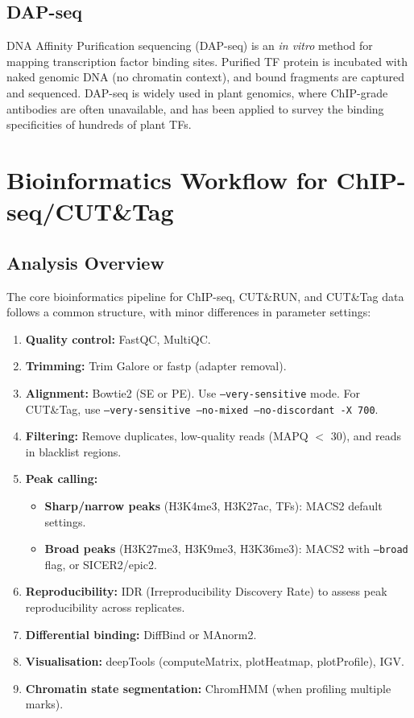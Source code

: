 \subsection{DAP-seq}
\label{subsec:histones:dap}

DNA Affinity Purification sequencing (DAP-seq) is an \textit{in vitro} method for mapping transcription factor binding sites. Purified TF protein is incubated with naked genomic DNA (no chromatin context), and bound fragments are captured and sequenced. DAP-seq is widely used in plant genomics, where ChIP-grade antibodies are often unavailable, and has been applied to survey the binding specificities of hundreds of plant TFs.

\section{Bioinformatics Workflow for ChIP-seq/CUT\&Tag}
\label{sec:histones:bioinformatics}

\subsection{Analysis Overview}
\label{subsec:histones:analysis-overview}

The core bioinformatics pipeline for ChIP-seq, CUT\&RUN, and CUT\&Tag data follows a common structure, with minor differences in parameter settings:

\begin{enumerate}[itemsep=2pt]
  \item \textbf{Quality control:} FastQC, MultiQC.
  \item \textbf{Trimming:} Trim Galore or fastp (adapter removal).
  \item \textbf{Alignment:} Bowtie2 (SE or PE). Use \texttt{--very-sensitive} mode. For CUT\&Tag, use \texttt{--very-sensitive --no-mixed --no-discordant -X 700}.
  \item \textbf{Filtering:} Remove duplicates, low-quality reads (MAPQ $<$ 30), and reads in blacklist regions.
  \item \textbf{Peak calling:}
    \begin{itemize}[itemsep=1pt]
      \item \textbf{Sharp/narrow peaks} (H3K4me3, H3K27ac, TFs): MACS2 default settings.
      \item \textbf{Broad peaks} (H3K27me3, H3K9me3, H3K36me3): MACS2 with \texttt{--broad} flag, or SICER2/epic2.
    \end{itemize}
  \item \textbf{Reproducibility:} IDR (Irreproducibility Discovery Rate) to assess peak reproducibility across replicates.
  \item \textbf{Differential binding:} DiffBind or MAnorm2.
  \item \textbf{Visualisation:} deepTools (computeMatrix, plotHeatmap, plotProfile), IGV.
  \item \textbf{Chromatin state segmentation:} ChromHMM (when profiling multiple marks).
\end{enumerate}

